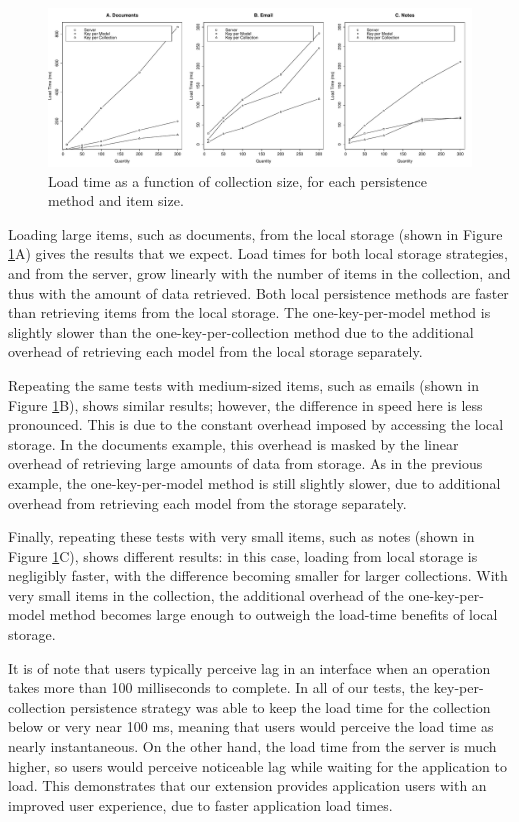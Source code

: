 \documentclass[12pt]{article}
\begin{document}
\begin{figure}[th]
  \centering
  \includegraphics[width=\textwidth]{lines.pdf}
  \caption{Load time as a function of collection size, for each persistence
  method and item size.}
  \label{fig:line}
\end{figure}

Loading large items, such as documents, from the local storage (shown in Figure
\ref{fig:line}A) gives the results that we expect. Load times for both
local storage strategies, and from the server, grow linearly with the number of
items in the collection, and thus with the amount of data retrieved. Both local
persistence methods are faster than retrieving items from the local storage.
The one-key-per-model method is slightly slower than the one-key-per-collection
method due to the additional overhead of retrieving each model from the local
storage separately.

Repeating the same tests with medium-sized items, such as emails (shown in
Figure \ref{fig:line}B), shows similar results; however, the difference in
speed here is less pronounced. This is due to the constant overhead imposed by
accessing the local storage. In the documents example, this overhead is masked
by the linear overhead of retrieving large amounts of data from storage. As in
the previous example, the one-key-per-model method is still slightly slower,
due to additional overhead from retrieving each model from the storage
separately.

Finally, repeating these tests with very small items, such as notes (shown in
Figure \ref{fig:line}C), shows different results: in this case, loading from
local storage is negligibly faster, with the difference becoming smaller for
larger collections. With very small items in the collection, the additional
overhead of the one-key-per-model method becomes large enough to outweigh the
load-time benefits of local storage.

It is of note that users typically perceive lag in an interface when an
operation takes more than 100 milliseconds to complete. In all of our tests,
the key-per-collection persistence strategy was able to keep the load time for the
collection below or very near 100 ms, meaning that users would perceive the
load time as nearly instantaneous. On the other hand, the load time from the server is much
higher, so users would perceive noticeable lag while waiting for the application
to load. This demonstrates that our extension provides application users with
an improved user experience, due to faster application load times. 
\end{document}
